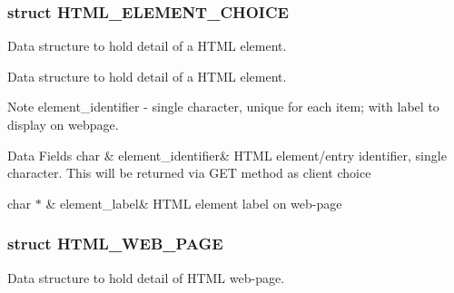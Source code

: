 \subsubsection{struct H\+T\+M\+L\+\_\+\+E\+L\+E\+M\+E\+N\+T\+\_\+\+C\+H\+O\+I\+CE}
Data structure to hold detail of a H\+T\+ML element. 

Data structure to hold detail of a H\+T\+ML element. \begin{DoxyNote}{Note}
element\+\_\+identifier -\/ single character, unique for each item; with label to display on webpage. 
\end{DoxyNote}
\begin{DoxyFields}{Data Fields}
char\hypertarget{group__wireless__interface_aefc0b576bbc210a293a86b9b22f9bb6b}{}\label{group__wireless__interface_aefc0b576bbc210a293a86b9b22f9bb6b}
&
element\+\_\+identifier&
H\+T\+ML element/entry identifier, single character. This will be returned via G\+ET method as client choice \\
\hline

char $\ast$\hypertarget{group__wireless__interface_a6eb09fc818457c351675663e86368fe9}{}\label{group__wireless__interface_a6eb09fc818457c351675663e86368fe9}
&
element\+\_\+label&
H\+T\+ML element label on web-\/page \\
\hline

\end{DoxyFields}
\label{struct_h_t_m_l___w_e_b___p_a_g_e}
\hypertarget{group__wireless__interface_struct_h_t_m_l___w_e_b___p_a_g_e}{}
\subsubsection{struct H\+T\+M\+L\+\_\+\+W\+E\+B\+\_\+\+P\+A\+GE}
Data structure to hold detail of H\+T\+ML web-\/page. 

